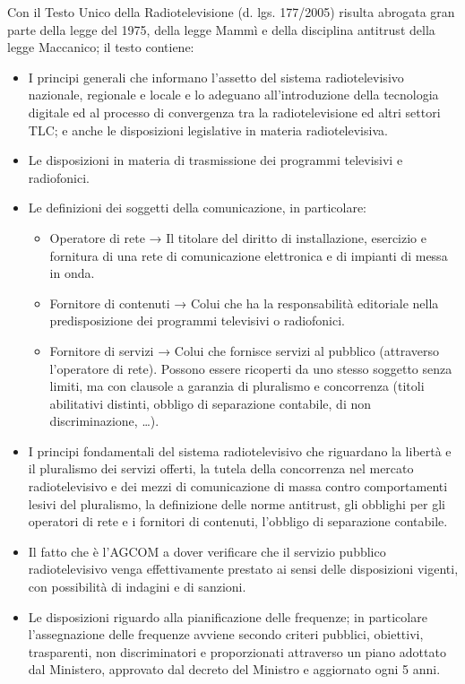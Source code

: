 Con il Testo Unico della Radiotelevisione (d. lgs. 177/2005) risulta abrogata gran parte della legge del 1975, della legge Mammì e della disciplina antitrust della legge Maccanico; il testo contiene:
\begin{itemize}
    \item I principi generali che informano l’assetto del sistema radiotelevisivo nazionale, regionale e locale e lo adeguano all’introduzione della tecnologia digitale ed al processo di convergenza tra la radiotelevisione ed altri settori TLC; e anche le disposizioni legislative in materia radiotelevisiva.
    \item Le disposizioni in materia di trasmissione dei programmi televisivi e radiofonici.
    \item Le definizioni dei soggetti della comunicazione, in particolare:
        \begin{itemize}
            \item Operatore di rete → Il titolare del diritto di installazione, esercizio e fornitura di una rete di comunicazione elettronica e di impianti di messa in onda.
            \item Fornitore di contenuti → Colui che ha la responsabilità editoriale nella predisposizione dei programmi televisivi o radiofonici.
            \item Fornitore di servizi → Colui che fornisce servizi al pubblico (attraverso l’operatore di rete). Possono essere ricoperti da uno stesso soggetto senza limiti, ma con clausole a garanzia di pluralismo e concorrenza (titoli abilitativi distinti, obbligo di separazione contabile, di non discriminazione, …).
        \end{itemize}
    \item I principi fondamentali del sistema radiotelevisivo che riguardano la libertà e il pluralismo dei servizi offerti, la tutela della concorrenza nel mercato radiotelevisivo e dei mezzi di comunicazione di massa contro comportamenti lesivi del pluralismo, la definizione delle norme antitrust, gli obblighi per gli operatori di rete e i fornitori di contenuti, l’obbligo di separazione contabile.
    \item Il fatto che è l’AGCOM a dover verificare che il servizio pubblico radiotelevisivo venga effettivamente prestato ai sensi delle disposizioni vigenti, con possibilità di indagini e di sanzioni.
    \item Le disposizioni riguardo alla pianificazione delle frequenze; in particolare l’assegnazione delle frequenze avviene secondo criteri pubblici, obiettivi, trasparenti, non discriminatori e proporzionati attraverso un piano adottato dal Ministero, approvato dal decreto del Ministro e aggiornato ogni 5 anni.
\end{itemize}

